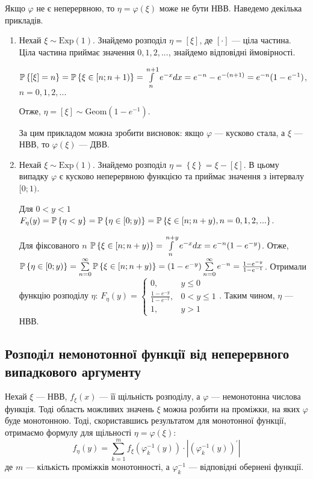 \begin{remark}
    Якщо $\varphi$ не є неперервною, то $\eta = \varphi(\xi)$ може не бути НВВ. Наведемо декілька прикладів.
    \begin{enumerate}
        \item Нехай $\xi \sim \mathrm{Exp}(1)$. Знайдемо розподіл $\eta = \left[ \xi\right]$, де $\left[ \cdot\right]$ --- ціла частина.
        Ціла частина приймає значення $0, 1, 2, ...$, знайдемо відповідні ймовірності. 
        
        $\P\left\{ \left[ \xi\right] = n\right\} = \P\left\{ \xi \in [n; n+1)\right\} = \int\limits_n^{n+1} e^{-x} dx = e^{-n} - e^{-(n+1)} = e^{-n}(1 - e^{-1})$, $n = 0, 1, 2, ...$

        Отже, $\eta = \left[ \xi\right] \sim \mathrm{Geom}(1-e^{-1})$.

        За цим прикладом можна зробити висновок: якщо $\varphi$ --- кусково стала, а $\xi$ --- НВВ, то $\varphi(\xi)$ --- ДВВ.
        \item Нехай $\xi \sim \mathrm{Exp}(1)$. Знайдемо розподіл $\eta = \left\{ \xi\right\} = \xi - \left[ \xi\right]$. 
        В цьому випадку $\varphi$ є кусково неперервною функцією та приймає значення з інтервалу $[0; 1)$.
        
        Для $0< y < 1$ $F_\eta (y) = \P\left\{\eta < y\right\} = \P\left\{\eta \in [0; y)\right\} = \P\left\{\xi \in [n; n+y), n = 0, 1, 2, ...\right\}$.

        Для фіксованого $n$ $\P\left\{\xi \in [n; n+y)\right\} = \int\limits_n^{n+y} e^{-x} dx = e^{-n}(1 - e^{-y})$. 
        Отже, $\P\left\{\eta \in [0; y)\right\} = \sum\limits_{n=0}^{\infty} \P\left\{\xi \in [n; n+y)\right\} = (1 - e^{-y}) \sum\limits_{n=0}^{\infty} e^{-n} = \frac{1 - e^{-y}}{1 - e^{-1}}$. Отримали функцію розподілу $\eta$:
        $F_\eta (y) = \begin{cases}
            0, & y \leq 0 \\
            \frac{1 - e^{-y}}{1 - e^{-1}}, & 0 < y \leq 1 \\
            1, & y > 1
        \end{cases}$. Таким чином, $\eta$ --- НВВ.
    \end{enumerate}
\end{remark}

\subsection{Розподіл немонотонної функції від неперервного випадкового аргументу}
Нехай $\xi$ --- НВВ, $f_\xi(x)$ --- її щільність розподілу, а $\varphi$ --- немонотонна числова функція.
Тоді область можливих значень $\xi$ можна розбити на проміжки, на яких $\varphi$ буде монотонною. 
Тоді, скориставшись результатом для монотонної функції, отримаємо формулу для щільності $\eta = \varphi(\xi)$:
$$ f_\eta (y) = \sum\limits_{k=1}^m f_\xi\left(\varphi_k^{-1} (y)\right) \cdot \left|\left(\varphi_k^{-1} (y) \right)^{\prime}\right|$$
де $m$ --- кількість проміжків монотонності, а $\varphi_k^{-1}$ --- відповідні обернені функції.

